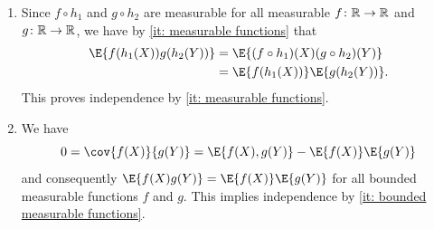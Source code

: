 \begin{solution}
\begin{enumerate}[wide=0pt]
    \item[\ref{it: indep stable under transformation}]
    Since \(f\circ h_1\) and \(g \circ h_2\) are measurable for all
    measurable \(f\colon \mathbb{R} \to \mathbb{R}\) and \(g\colon \mathbb{R} \to \mathbb{R}\), we have by \ref{it: measurable
    functions} that
    \begin{align*}
        \E{f(h_1(X))g(h_2(Y))}
        &= \E{(f\circ h_1)(X)(g\circ h_2)(Y)}
        \\
        &= \E{f(h_1(X))}\E{g(h_2(Y))}.
    \end{align*}
    This proves independence by \ref{it: measurable functions}. 

    \item[\ref{it: all transformations uncorrelated implies independence}]
    We have
    \[
        0 = \cov{f(X)}{g(Y)} = \E{f(X),g(Y)} - \E{f(X)}\E{g(Y)}
    \]
    and consequently \(\E{f(X)g(Y)} = \E{f(X)}\E{g(Y)}\) for all
    bounded measurable functions \(f\) and \(g\).  This implies
    independence by \ref{it: bounded measurable functions}.
\end{enumerate}
\end{solution}
